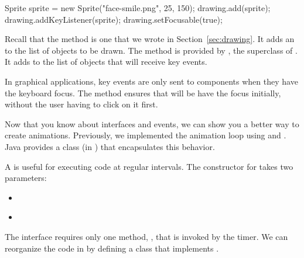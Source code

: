 \begin{code}
Sprite sprite = new Sprite("face-smile.png", 25, 150);
drawing.add(sprite);
drawing.addKeyListener(sprite);
drawing.setFocusable(true);
\end{code}

Recall that the  method is one that we wrote in Section~\ref{sec:drawing}.
It adds an  to the list of objects to be drawn.
The  method is provided by , the superclass of .
It adds  to the list of objects that will receive key events.

In graphical applications, key events are only sent to components when they have the keyboard focus.
The  method ensures that  will be have the focus initially, without the user having to click on it first.


Now that you know about interfaces and events, we can show you a better way to create animations.
Previously, we implemented the animation loop using  and .
Java provides a  class (in ) that encapsulates this behavior.

A  is useful for executing code at regular intervals.
The constructor for  takes two parameters:

\begin{itemize}
\item {} {\tt ~~~~~~~~~~~~~~~} 

\item {} {\tt ~} 
\end{itemize}

The  interface requires only one method, , that is invoked by the timer.
We can reorganize the code in  by defining a class that implements .

